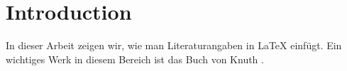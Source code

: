 \section{Introduction}

In dieser Arbeit zeigen wir, wie man Literaturangaben in LaTeX einfügt. Ein wichtiges Werk in diesem Bereich ist das Buch von Knuth \cite{knuth1997}. 